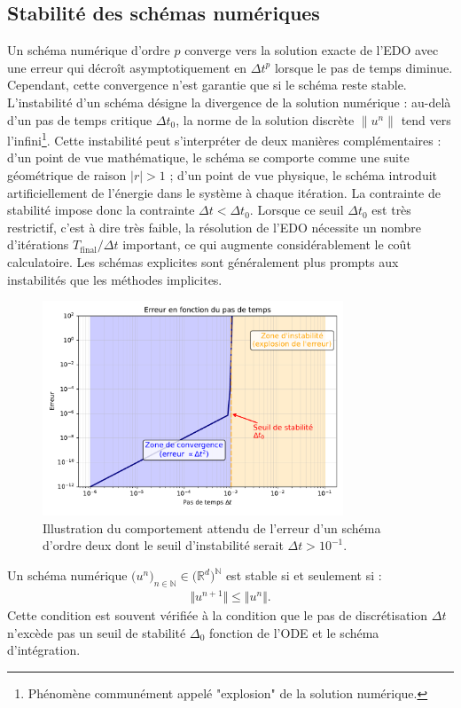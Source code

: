 \subsection{Stabilité des schémas numériques}\label{par:stabilite_edo}
Un schéma numérique d'ordre $p$ converge vers la solution exacte de l'EDO avec une erreur qui décroît asymptotiquement en $\Delta t^p$ lorsque le pas de temps diminue.
Cependant, cette convergence n'est garantie que si le schéma reste stable.
L'instabilité d'un schéma désigne la divergence de la solution numérique : au-delà d'un pas de temps critique $\Delta t_0$, la norme de la solution discrète $\|u^n\|$ tend vers l'infini\footnote{Phénomène communément appelé "explosion" de la solution numérique.}.
Cette instabilité peut s'interpréter de deux manières complémentaires : d'un point de vue mathématique, le schéma se comporte comme une suite géométrique de raison $|r| > 1$ ; 
d'un point de vue physique, le schéma introduit artificiellement de l'énergie dans le système à chaque itération.
La contrainte de stabilité impose donc la contrainte $\Delta t < \Delta t_0$. 
Lorsque ce seuil $\Delta t_0$ est très restrictif, c'est à dire très faible, la résolution de l'EDO nécessite un nombre d'itérations $T_{\text{final}}/\Delta t$ important,
ce qui augmente considérablement le coût calculatoire. 
Les schémas explicites sont généralement plus prompts aux instabilités que les méthodes implicites.
\begin{figure}[htbp]
    \centering
    \includegraphics[width=0.8\textwidth]{media/3_/2_/exemple_satabilite.pdf}
    \caption{Illustration du comportement attendu de l'erreur d'un schéma d'ordre deux dont le seuil d'instabilité serait $\Delta t > 10^{-1}$.}
    \label{fig:stabilite_schema}
\end{figure}
\begin{definition}
    Un schéma numérique $\bigl( u^n \bigr)_{n \in \mathbb{N}} \in\bigl(\mathbb{R}^d \bigr)^{\mathbb{N}}$ est stable si et seulement si :
    \begin{align}
        \Vert u^{n+1} \Vert \leq \Vert u^n \Vert.
    \end{align}
    Cette condition est souvent vérifiée à la condition que le pas de discrétisation $\Delta t$ n'excède pas un seuil de stabilité $\Delta_0$ fonction de l'ODE et le schéma d'intégration.
\end{definition}
